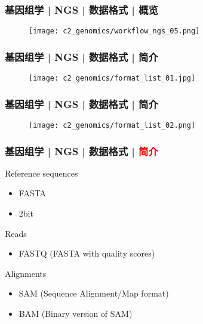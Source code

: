 \begin{frame}
  \frametitle{基因组学 | NGS | 数据格式 | 概览}
  \begin{figure}
    \centering
    \texttt{[image: c2\_genomics/workflow\_ngs\_05.png]}
  \end{figure}
\end{frame}

\begin{frame}
  \frametitle{基因组学 | NGS | 数据格式 | 简介}
  \begin{figure}
    \centering
    \texttt{[image: c2\_genomics/format\_list\_01.jpg]}
  \end{figure}
\end{frame}
    
\begin{frame}
  \frametitle{基因组学 | NGS | 数据格式 | 简介}
  \begin{figure}
    \centering
    \texttt{[image: c2\_genomics/format\_list\_02.png]}
  \end{figure}
\end{frame}

\begin{frame}
  \frametitle{基因组学 | NGS | 数据格式 | \textcolor{red}{简介}}
  \begin{block}{Reference sequences}
    \begin{itemize}
      \item FASTA
      \item 2bit
    \end{itemize}
  \end{block}
  \pause
  \begin{block}{Reads}
    \begin{itemize}
      \item FASTQ (FASTA with quality scores)
    \end{itemize}
  \end{block}
  \pause
  \begin{block}{Alignments}
    \begin{itemize}
      \item SAM (Sequence Alignment/Map format)
      \item BAM (Binary version of SAM)
    \end{itemize}
  \end{block}
\end{frame}
    
